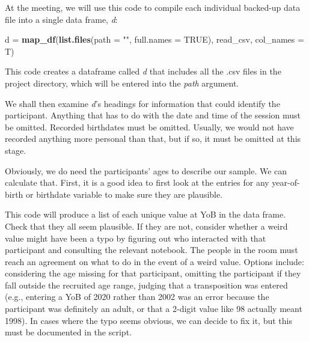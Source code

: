 \documentclass[12pt,]{book}
\newenvironment{Shaded}{\begin{snugshade}}{\end{snugshade}}
\newcommand{\KeywordTok}[1]{\textcolor[rgb]{0.13,0.29,0.53}{\textbf{#1}}}
\newcommand{\DataTypeTok}[1]{\textcolor[rgb]{0.13,0.29,0.53}{#1}}
\newcommand{\StringTok}[1]{\textcolor[rgb]{0.31,0.60,0.02}{#1}}
\newcommand{\OtherTok}[1]{\textcolor[rgb]{0.56,0.35,0.01}{#1}}
\newcommand{\OperatorTok}[1]{\textcolor[rgb]{0.81,0.36,0.00}{\textbf{#1}}}
\newcommand{\NormalTok}[1]{#1}
\theoremstyle{definition}
\theoremstyle{definition}
\theoremstyle{definition}
\theoremstyle{remark}
\begin{document}
At the meeting, we will use this code to compile each individual
backed-up data file into a single data frame, \emph{d}:

\begin{Shaded}
\begin{Highlighting}[]
\NormalTok{d =}\StringTok{ }\KeywordTok{map_df}\NormalTok{(}\KeywordTok{list.files}\NormalTok{(}\DataTypeTok{path =} \StringTok{""}\NormalTok{, }\DataTypeTok{full.names =} \OtherTok{TRUE}\NormalTok{), }
\NormalTok{                 read_csv, }\DataTypeTok{col_names =}\NormalTok{ T)}
\end{Highlighting}
\end{Shaded}

This code creates a dataframe called \emph{d} that includes all the .csv
files in the project directory, which will be entered into the
\emph{path} argument.

We shall then examine \emph{d}'s headings for information that could
identify the participant. Anything that has to do with the date and time
of the session must be omitted. Recorded birthdates must be omitted.
Usually, we would not have recorded anything more personal than that,
but if so, it must be omitted at this stage.

Obviously, we do need the participants' ages to describe our sample. We
can calculate that. First, it is a good idea to first look at the
entries for any year-of-birth or birthdate variable to make sure they
are plausible.

\begin{Shaded}
\end{Shaded}

This code will produce a list of each unique value at YoB in the data
frame. Check that they all seem plausible. If they are not, consider
whether a weird value might have been a typo by figuring out who
interacted with that participant and consulting the relevant notebook.
The people in the room must reach an agreement on what to do in the
event of a weird value. Options include: considering the age missing for
that participant, omitting the participant if they fall outside the
recruited age range, judging that a transposition was entered (e.g.,
entering a YoB of 2020 rather than 2002 was an error because the
participant was definitely an adult, or that a 2-digit value like 98
actually meant 1998). In cases where the typo seems obvious, we can
decide to fix it, but this must be documented in the script.
\end{document}
